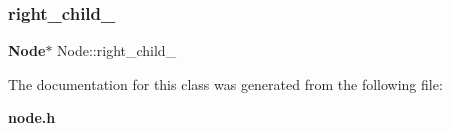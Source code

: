 \mbox{\label{class_node_a7328862eaa6dea28018326549b3294d3}} 
\subsubsection{right_child_}
{\footnotesize\ttfamily \textbf{ Node}$\ast$ Node\+::right_child_\hspace{0.3cm}{\ttfamily [protected]}}



The documentation for this class was generated from the following file\+:\begin{DoxyCompactItemize}
\item 
\textbf{ node.\+h}\end{DoxyCompactItemize}

